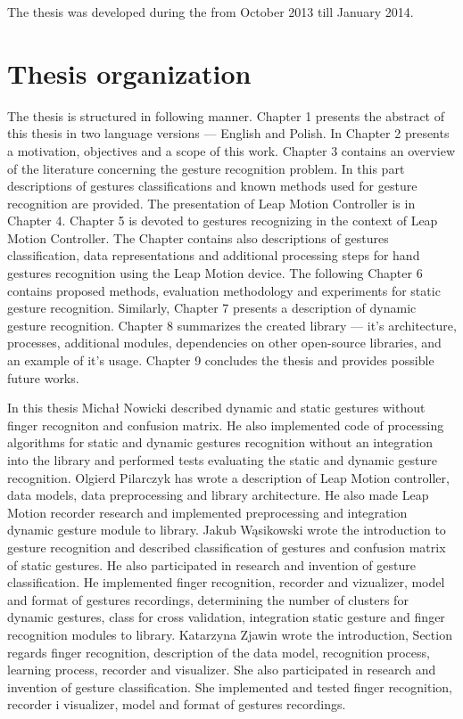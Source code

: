 The thesis was developed during the from October 2013 till January 2014.


\section{Thesis organization}
The thesis is structured in following manner. 
Chapter 1 presents the abstract of this thesis in two language versions --- English and Polish. 
In Chapter 2 presents a motivation, objectives and a scope of this work. 
Chapter 3 contains an overview of the literature concerning the gesture recognition problem. 
In this part descriptions of gestures classifications and known methods used for gesture recognition are provided. 
The presentation of Leap Motion Controller is in Chapter 4. Chapter 5 is devoted to gestures recognizing in the context of Leap Motion Controller.
The Chapter contains also descriptions of gestures classification, data representations and additional processing steps for hand gestures recognition using the Leap Motion device. 
The following Chapter 6 contains proposed methods, evaluation methodology and experiments for static gesture recognition. 
Similarly, Chapter 7 presents a description of dynamic gesture recognition. 
Chapter 8 summarizes the created library --- it's architecture, processes, additional modules, dependencies on other open-source libraries, and an example of it's usage. 
Chapter 9 concludes the thesis and provides possible future works. 


In this thesis Michał Nowicki described dynamic and static gestures without finger recogniton and confusion matrix. He also implemented code of processing algorithms for static and dynamic gestures recognition without an integration into the library and performed tests evaluating the static and dynamic gesture recognition. Olgierd Pilarczyk has wrote a description of Leap Motion controller, data models, data preprocessing and library architecture. He also made Leap Motion recorder research and implemented preprocessing and integration dynamic gesture module to library. Jakub Wąsikowski wrote the introduction to gesture recognition and described classification of gestures and confusion matrix of static gestures. He also participated in research and invention of gesture classification. He implemented finger recognition, recorder and vizualizer, model and format of gestures recordings, determining the number of clusters for dynamic gestures, class for cross validation, integration static gesture and finger recognition modules to library. Katarzyna Zjawin wrote the introduction, Section regards finger recognition, description of the data model, recognition process, learning process, recorder and visualizer. She also participated in research and invention of gesture classification. She implemented and tested finger recognition, recorder i visualizer, model and format of gestures recordings.


